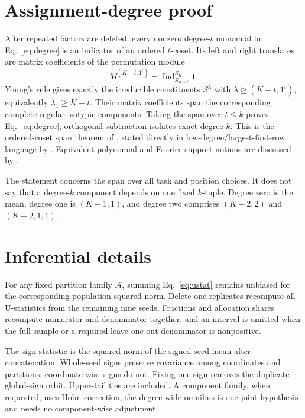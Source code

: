 \documentclass{article}
\begin{document}
\clearpage



\clearpage
\appendix

\section{Assignment-degree proof}
\label{app:proof}

After repeated factors are deleted, every nonzero degree-$t$ monomial in Eq.~\eqref{eq:degree} is an indicator of an ordered $t$-coset. Its left and right translates are matrix coefficients of the permutation module
\begin{equation}
  M^{(K-t,1^t)}=\operatorname{Ind}_{S_{K-t}}^{S_K}\mathbf1.
\end{equation}
Young's rule gives exactly the irreducible constituents $S^\lambda$ with $\lambda\unrhd(K-t,1^t)$, equivalently $\lambda_1\geq K-t$. Their matrix coefficients span the corresponding complete regular isotypic components. Taking the span over $t\leq k$ proves Eq.~\eqref{eq:degree}; orthogonal subtraction isolates exact degree $k$. This is the ordered-coset span theorem of \citet[Theorem~7]{ellis2011intersecting}, stated directly in low-degree/largest-first-row language by \citet[Theorem~1]{ellis2017lowdegree}. Equivalent polynomial and Fourier-support notions are discussed by \citet{dafni2021complexity}.

The statement concerns the span over all task and position choices. It does not say that a degree-$k$ component depends on one fixed $k$-tuple. Degree zero is the mean, degree one is $(K-1,1)$, and degree two comprises $(K-2,2)$ and $(K-2,1,1)$.

\section{Inferential details}

For any fixed partition family $\mathcal A$, summing Eq.~\eqref{eq:ustat} remains unbiased for the corresponding population squared norm. Delete-one replicates recompute all U-statistics from the remaining nine seeds. Fractions and allocation shares recompute numerator and denominator together, and an interval is omitted when the full-sample or a required leave-one-out denominator is nonpositive.

The sign statistic is the squared norm of the signed seed mean after concatenation. Whole-seed signs preserve covariance among coordinates and partitions; coordinate-wise signs do not. Fixing one sign removes the duplicate global-sign orbit. Upper-tail ties are included. A component family, when requested, uses Holm correction; the degree-wide omnibus is one joint hypothesis and needs no component-wise adjustment.
\end{document}
